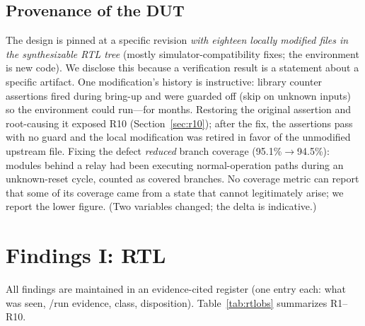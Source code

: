 \documentclass[conference]{IEEEtran}
\newcommand{\code}[1]{\texttt{\detokenize{#1}}}
\begin{document}
\subsection{Provenance of the DUT}
\label{sec:provenance}
The design is pinned at a specific revision \emph{with eighteen locally
	modified files in the synthesizable RTL tree} (mostly
simulator-compatibility fixes; the environment is new code). We
disclose this because a verification result is a statement about a
specific artifact. One modification's history is instructive: library
counter assertions fired during bring-up and were guarded off (skip on
unknown inputs) so the environment could run---for months. Restoring
the original assertion and root-causing it exposed R10
(Section~\ref{sec:r10}); after the fix, the assertions pass with no
guard and the local modification was retired in favor of the unmodified
upstream file. Fixing the defect \emph{reduced} branch coverage
(95.1\%$\to$94.5\%): modules behind a relay had been executing
normal-operation paths during an unknown-reset cycle, counted as
covered branches. No coverage metric can report that some of its
coverage came from a state that cannot legitimately arise; we report
the lower figure. (Two variables changed; the delta is indicative.)

\section{Findings I: RTL}
\label{sec:rtlfindings}

All findings are maintained in an evidence-cited register (one entry
each: what
was seen, \code{file:line}/run evidence, class, disposition).
Table~\ref{tab:rtlobs} summarizes R1--R10.
\end{document}
